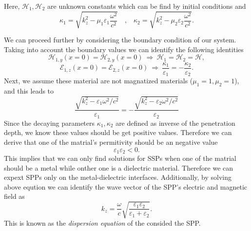 \documentclass[a4paper]{article}
\numberwithin{equation}{subsection}
\numberwithin{equation}{section}
\begin{document}
Here, $\mathcal{H}_1, \mathcal{H}_2$ are unknown constants which can be find by initial conditions and
\begin{equation}
  \kappa_1 = \sqrt{k_z^2 - \mu_1\varepsilon_1 \frac{\omega^2}{c^2}} \quad
  \text{,} \quad
  \kappa_2 = \sqrt{k_z^2 - \mu_2\varepsilon_2 \frac{\omega^2}{c^2}}.
\end{equation}

We can proceed further by considering the boundary condition of our system. Taking into account the boundary values we can identify the following identities
\begin{equation}
  {\mathcal{H}_{1,y}}(x =0) =  {\mathcal{H}_{2,y}}(x=0) ~\Longrightarrow~
  {\mathcal{H}_{1}} = {\mathcal{H}_{2}} = {\mathcal{H}},
\end{equation}
\begin{equation}
  {\mathcal{E}_{1,z}}(x =0) =  {\mathcal{E}_{2,z}}(x=0) ~\Longrightarrow~
  \frac{\kappa_1}{\varepsilon_1} = - \frac{\kappa_2}{\varepsilon_2}.
\end{equation}
Next, we assume these material are not magnatized materials ($\mu_1 =1,\mu_2 =1$), and this leads to
\begin{equation}
  \frac{\sqrt{k_z^2 - \varepsilon_1 {\omega^2}/{c^2}}}{\varepsilon_1} = - \frac{\sqrt{k_z^2 - \varepsilon_2 {\omega^2}/{c^2}}}{\varepsilon_2}
\end{equation}
Since the decaying parameters $\kappa_1,\kappa_2$ are defined as inverse of the penetration depth, we know these values should be get positive values. Therefore we can derive that one of the matrial's permitivity should be an negative value
\begin{equation}
  \varepsilon_1 \varepsilon_2 < 0.
\end{equation}
This implies that we can only find solutions for SSPs when one of the matrial should be a metal while onther one is a dielectric material. Therefore we can expext SPPs only on the metal-dielectric interfaces. Additionally, by solving above eqution we can identify the wave vector of the SPP's electric and magnetic field as
\begin{equation}
  k_z = \frac{\omega}{c} \sqrt{\frac{\varepsilon_1\varepsilon_2}{\varepsilon_1 + \varepsilon_2}}.
\end{equation}
This is known as the \textit{dispersion equation} of the consided the SPP.
\end{document}
